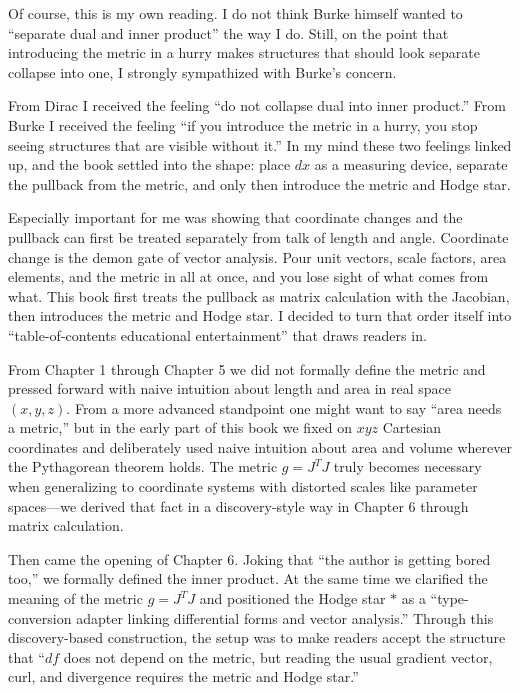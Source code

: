 Of course, this is my own reading. I do not think Burke himself wanted
to ``separate dual and inner product'' the way I do. Still, on the point
that introducing the metric in a hurry makes structures that should look
separate collapse into one, I strongly sympathized with Burke's concern.

From Dirac I received the feeling ``do not collapse dual into inner
product.'' From Burke I received the feeling ``if you introduce the
metric in a hurry, you stop seeing structures that are visible without
it.'' In my mind these two feelings linked up, and the book settled into
the shape: place \(dx\) as a measuring device, separate the pullback
from the metric, and only then introduce the metric and Hodge star.

Especially important for me was showing that coordinate changes and the
pullback can first be treated separately from talk of length and angle.
Coordinate change is the demon gate of vector analysis. Pour unit
vectors, scale factors, area elements, and the metric in all at once,
and you lose sight of what comes from what. This book first treats the
pullback as matrix calculation with the Jacobian, then introduces the
metric and Hodge star. I decided to turn that order itself into
``table-of-contents educational entertainment'' that draws readers in.

From Chapter 1 through Chapter 5 we did not formally define the metric
and pressed forward with naive intuition about length and area in real
space \((x,y,z)\). From a more advanced standpoint one might want to say
``area needs a metric,'' but in the early part of this book we fixed on
\(xyz\) Cartesian coordinates and deliberately used naive intuition
about area and volume wherever the Pythagorean theorem holds. The metric
\(g = J^T J\) truly becomes necessary when generalizing to coordinate
systems with distorted scales like parameter spaces---we derived that
fact in a discovery-style way in Chapter 6 through matrix calculation.

Then came the opening of Chapter 6. Joking that ``the author is getting
bored too,'' we formally defined the inner product. At the same time we
clarified the meaning of the metric \(g = J^T J\) and positioned the
Hodge star \(\ast\) as a ``type-conversion adapter linking differential
forms and vector analysis.'' Through this discovery-based construction,
the setup was to make readers accept the structure that ``\(df\) does
not depend on the metric, but reading the usual gradient vector, curl,
and divergence requires the metric and Hodge star.''

